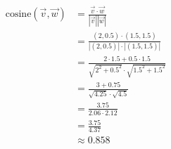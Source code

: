 \documentclass[preview]{standalone}
\begin{document}
\begin{align*}
\text{cosine}(\vec{v}, \vec{w}) &= \frac{\vec{v} \cdot \vec{w}}{|\vec{v}| |\vec{w}|}\\ &= \frac{(2, 0.5) \cdot (1.5, 1.5)}{|(2, 0.5)| \cdot |(1.5, 1.5)|}\\ &= \frac{2 \cdot 1.5 + 0.5 \cdot 1.5}{\sqrt{2^2 + 0.5^2} \cdot \sqrt{1.5^2 + 1.5^2}}\\ &= \frac{3 + 0.75}{\sqrt{4.25} \cdot \sqrt{4.5}}\\ &= \frac{3.75}{2.06 \cdot 2.12}\\ &= \frac{3.75}{4.37}\\ &\approx 0.858
\end{align*}
\end{document}
